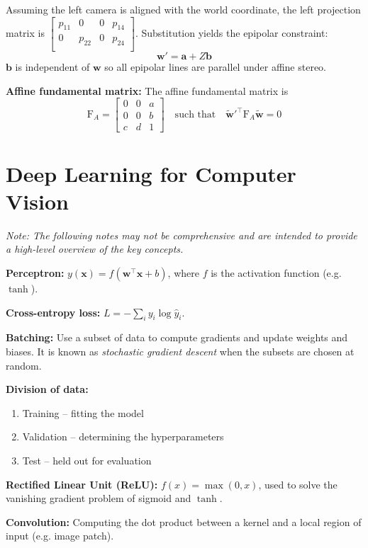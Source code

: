 \documentclass[12pt]{article}
\begin{document}
Assuming the left camera is aligned with the world coordinate, the left projection matrix is $\begin{bmatrix}
    p_{11} & 0 & 0 & p_{14} \\
    0 & p_{22} & 0 & p_{24} \\
\end{bmatrix}$. Substitution yields the epipolar constraint: $$\mathbf{w}' = \mathbf{a} + Z \mathbf{b}$$ $\mathbf{b}$ is independent of $\mathbf{w}$ so all epipolar lines are parallel under affine stereo.

\textbf{Affine fundamental matrix:} The affine fundamental matrix is 
$$
\mathrm{F}_A = \begin{bmatrix}
    0 & 0 & a \\
    0 & 0 & b \\
    c & d & 1
\end{bmatrix} \quad \text{such that} \quad
\tilde{\mathbf{w}}'^\top \mathrm{F}_A \tilde{\mathbf{w}} = 0
$$

\newpage
\section{Deep Learning for Computer Vision}
\textit{Note: The following notes may not be comprehensive and are intended to provide a high-level overview of the key concepts.}

\textbf{Perceptron:} $y(\mathbf{x}) = f(\mathbf{w}^\top \mathbf{x} + b)$, where $f$ is the activation function (e.g. $\tanh$).

\textbf{Cross-entropy loss:} $L = -\sum_i y_i \log \hat{y}_i$.

\textbf{Batching:} Use a subset of data to compute gradients and update weights and biases. It is known as \textit{stochastic gradient descent} when the subsets are chosen at random.

\textbf{Division of data:}
\begin{enumerate}
    \item Training -- fitting the model
    \item Validation -- determining the hyperparameters
    \item Test -- held out for evaluation
\end{enumerate}

\textbf{Rectified Linear Unit (ReLU):} $f(x) = \max(0, x)$, used to solve the vanishing gradient problem of sigmoid and $\tanh$.

\textbf{Convolution:} Computing the dot product between a kernel and a local region of input (e.g. image patch).
\end{document}
